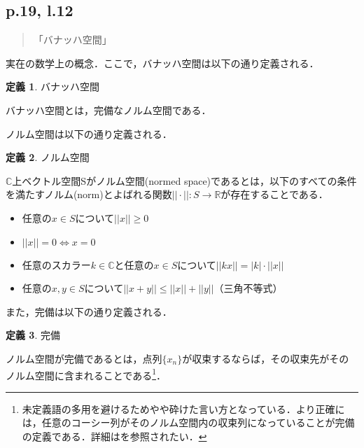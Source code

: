 \documentclass[10pt, a5paper, twoside]{jsarticle}
\theoremstyle{definition}
\newtheorem{dfn}{定義}
\begin{document}
            \subsection{p.19, l.12}

                \begin{quote}

                    「バナッハ空間」

                \end{quote}

                実在の数学上の概念．ここで，バナッハ空間は以下の通り定義される\cite{mtz}．

                \begin{dfn}

                    バナッハ空間

                    バナッハ空間とは，完備なノルム空間である．

                \end{dfn}

                ノルム空間は以下の通り定義される\cite{mtz}．

                \begin{dfn}

                    ノルム空間

                    $\mathbb{C}$上ベクトル空間Sがノルム空間(normed space)であるとは，以下のすべての条件を満たすノルム(norm)とよばれる関数$||\cdot||: S \to \mathbb{R}$が存在することである．

                    \begin{itemize}
                        \item 任意の$x \in S$について$||x|| \geq 0$
                        \item $||x|| = 0 \Leftrightarrow x = 0$
                        \item 任意のスカラー$k \in \mathbb{C}$と任意の$x \in S$について$||k x|| = |k| \cdot||x||$
                        \item 任意の$x, y \in S$について$||x + y|| \leq ||x|| + ||y||$（三角不等式）
                    \end{itemize}

                \end{dfn}

                また，完備は以下の通り定義される\cite{mtz}．

            \newpage

                \begin{dfn}

                    完備

                    ノルム空間が完備であるとは，点列$\{x_n\}$が収束するならば，その収束先がそのノルム空間に含まれることである\footnote{未定義語の多用を避けるためやや砕けた言い方となっている．より正確には，任意のコーシー列がそのノルム空間内の収束列になっていることが完備の定義である．詳細は\cite{mtz}を参照されたい．}．

                \end{dfn}
\end{document}
